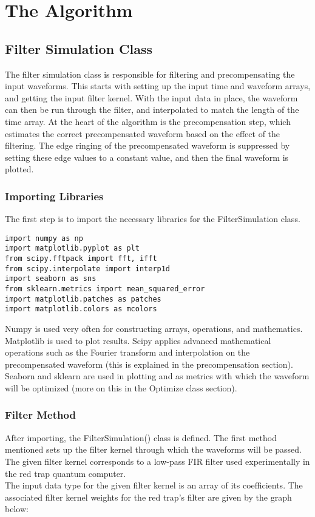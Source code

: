 \section{The Algorithm}
\subsection{Filter Simulation Class}
The filter simulation class is responsible for filtering and precompensating the input waveforms. This starts with setting up the input time and waveform arrays, and getting the input filter kernel. With the input data in place, the waveform can then be run through the filter, and interpolated to match the length of the time array. At the heart of the algorithm is the precompensation step, which estimates the correct precompensated waveform based on the effect of the filtering. The edge ringing of the precompensated waveform is suppressed by setting these edge values to a constant value, and then the final waveform is plotted.
\subsubsection{Importing Libraries}

The first step is to import the necessary libraries for the FilterSimulation class.

\begin{verbatim}
import numpy as np
import matplotlib.pyplot as plt
from scipy.fftpack import fft, ifft
from scipy.interpolate import interp1d
import seaborn as sns
from sklearn.metrics import mean_squared_error
import matplotlib.patches as patches
import matplotlib.colors as mcolors 
\end{verbatim}

Numpy is used very often for constructing arrays, operations, and mathematics. Matplotlib is used to plot results. Scipy applies advanced mathematical operations such as the Fourier transform and interpolation on the precompensated waveform (this is explained in the precompensation section). Seaborn and sklearn are used in plotting and as metrics with which the waveform will be optimized (more on this in the Optimize class section).

\subsubsection{Filter Method}

After importing, the FilterSimulation() class is defined. The first method mentioned sets up the filter kernel through which the waveforms will be passed. The given filter kernel corresponds to a low-pass FIR filter used experimentally in the red trap quantum computer. 
\\
The input data type for the given filter kernel is an array of its coefficients. The associated filter kernel weights for the red trap's filter are given by the graph below:

